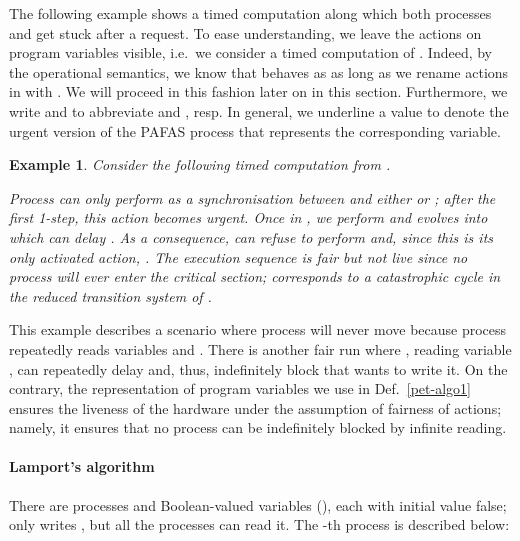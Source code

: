 \documentclass[copyright,creativecommons]{eptcs}
\newenvironment{tracex}{\ccspace{0.15}\noindent}{\ccspace{0.2}}
\newcommand{\ccspace}[1]{\vspace{#1cm}}
\newtheorem{example}[theorem]{Example}
\begin{document}
The following example shows a timed computation along which both processes
 and  get stuck after a request. To ease understanding,
we leave the actions on program variables visible, i.e.\ we consider a
timed computation of . Indeed, by the operational semantics, we know that
 behaves as  as long as we rename actions in  with
. We will proceed in this fashion later on in this section.
Furthermore, we write  and
 to abbreviate 
and , resp. In general, we underline a value to
denote the urgent version of the PAFAS process that represents the
corresponding variable. 
\begin{example}\rm\label{ex:pet-1}
Consider the following timed computation from .

\begin{tracex}

\end{tracex}

\noindent Process  can only perform  as a synchronisation
between  and either  or ; after the first  1-step,
this action becomes urgent. Once in , we perform 
and  evolves into  which can delay  .
As a consequence,  can refuse to perform  and, since this is its
only activated action, . The execution sequence
 is fair but not live since no process will
ever enter the critical section;  corresponds to a catastrophic cycle in the
reduced transition system of . 
\end{example}

This example describes a scenario where process  will never move
because process  repeatedly reads variables  and . There
is another fair run where , reading variable , can
repeatedly delay and, thus,  indefinitely block  that wants to
write it. On the contrary, the representation of program variables we use
in Def.~\ref{pet-algo1} ensures the liveness of the hardware under the
assumption of fairness of actions; namely, it ensures that no process can
be indefinitely blocked by infinite reading. 




\paragraph{Lamport's algorithm}
There are  processes and  Boolean-valued variables  (), each with initial value false;  only  writes ,
but all the processes can read it. The -th process is described below:
\end{document}
